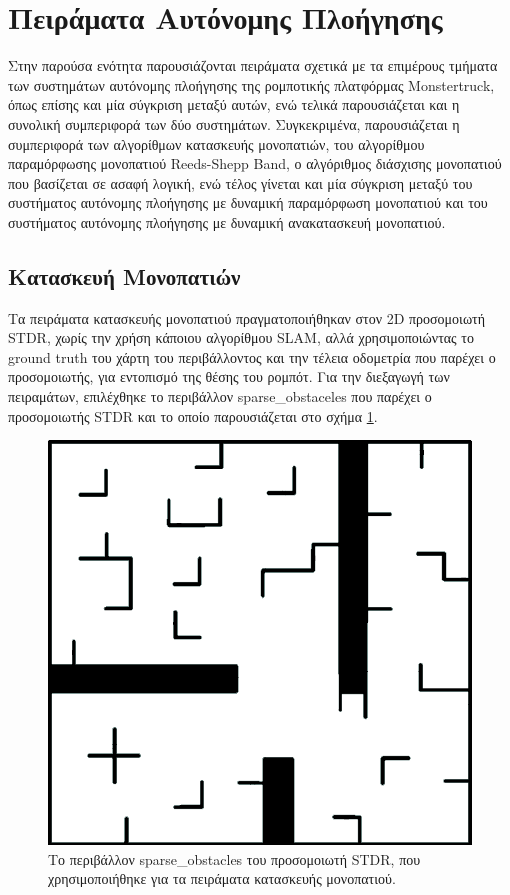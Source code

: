 \FloatBarrier


\newpage
\section{Πειράματα Αυτόνομης Πλοήγησης} \label{sec:navigation_experiments}
Στην παρούσα ενότητα παρουσιάζονται πειράματα σχετικά με τα επιμέρους τμήματα των συστημάτων αυτόνομης πλοήγησης της ρομποτικής πλατφόρμας Monstertruck, όπως επίσης και μία σύγκριση μεταξύ αυτών, ενώ τελικά παρουσιάζεται και η συνολική συμπεριφορά των δύο συστημάτων. Συγκεκριμένα, παρουσιάζεται η συμπεριφορά των αλγορίθμων κατασκευής μονοπατιών, του αλγορίθμου παραμόρφωσης μονοπατιού Reeds-Shepp Band, ο αλγόριθμος διάσχισης μονοπατιού που βασίζεται σε ασαφή λογική, ενώ τέλος γίνεται και μία σύγκριση μεταξύ του συστήματος αυτόνομης πλοήγησης με δυναμική παραμόρφωση μονοπατιού και του συστήματος αυτόνομης πλοήγησης με δυναμική ανακατασκευή μονοπατιού.

\subsection{Κατασκευή Μονοπατιών} \label{ssec:path_planning_experiments}
Τα πειράματα κατασκευής μονοπατιού πραγματοποιήθηκαν στον 2D προσομοιωτή STDR, χωρίς την χρήση κάποιου αλγορίθμου SLAM, αλλά χρησιμοποιώντας το ground truth του χάρτη του περιβάλλοντος και την τέλεια οδομετρία που παρέχει ο προσομοιωτής, για εντοπισμό της θέσης του ρομπότ. Για την διεξαγωγή των πειραμάτων, επιλέχθηκε το περιβάλλον sparse{\_}obstaceles που παρέχει ο προσομοιωτής STDR και το οποίο παρουσιάζεται στο σχήμα \ref{fig:sparse_obstacles}.

\begin{figure}[!ht]
	\centering
	\includegraphics[width=0.6\linewidth]{Chapters/Chapter5/Figures/sparse_obstacles.png}
	\caption{Το περιβάλλον sparse{\_}obstacles του προσομοιωτή STDR, που χρησιμοποιήθηκε για τα πειράματα κατασκευής μονοπατιού.}
	\label{fig:sparse_obstacles}
\end{figure}

